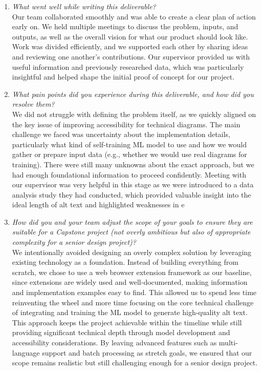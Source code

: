 \documentclass{article}
\begin{document}
\begin{enumerate}
    \item \textit{What went well while writing this deliverable?}\\
    Our team collaborated smoothly and was able to create a clear plan of action early on. We held multiple meetings to discuss the problem, inputs, and outputs, as well as the overall vision for what our product should look like. Work was divided efficiently, and we supported each other by sharing ideas and reviewing one another’s contributions. Our supervisor provided us with useful information and previously researched data, which was particularly insightful and helped shape the initial proof of concept for our project.


    \item \textit{What pain points did you experience during this deliverable, and how did you resolve them?}\\
    We did not struggle with defining the problem itself, as we quickly aligned on the key issue of improving accessibility for technical diagrams. The main challenge we faced was uncertainty about the implementation details, particularly what kind of self-training ML model to use and how we would gather or prepare input data (e.g., whether we would use real diagrams for training). There were still many unknowns about the exact approach, but we had enough foundational information to proceed confidently. Meeting with our supervisor was very helpful in this stage as we were introduced to a data analysis study they had conducted, which provided valuable insight into the ideal length of alt text and highlighted weaknesses in e

    \item \textit{How did you and your team adjust the scope of your goals to ensure they are suitable for a Capstone project (not overly ambitious but also of appropriate complexity for a senior design project)?}\\
    We intentionally avoided designing an overly complex solution by leveraging existing technology as a foundation. Instead of building everything from scratch, we chose to use a web browser extension framework as our baseline, since extensions are widely used and well-documented, making information and implementation examples easy to find. This allowed us to spend less time reinventing the wheel and more time focusing on the core technical challenge of integrating and training the ML model to generate high-quality alt text. This approach keeps the project achievable within the timeline while still providing significant technical depth through model development and accessibility considerations. By leaving advanced features such as multi-language support and batch processing as stretch goals, we ensured that our scope remains realistic but still challenging enough for a senior design project.

\end{enumerate}  
\end{document}
